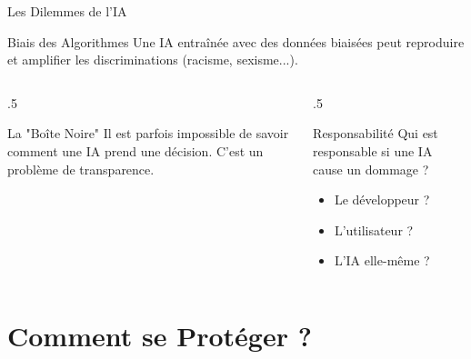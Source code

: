\documentclass[10pt, aspectratio=169]{beamer}
\begin{document}
\begin{frame}{Les Dilemmes de l'IA}
  \begin{alertblock}{Biais des Algorithmes}
    Une IA entraînée avec des données biaisées peut reproduire et amplifier les discriminations (racisme, sexisme...). 
  \end{alertblock}

  \begin{columns}[T]
    \begin{column}{.5\textwidth}
      \begin{block}{La "Boîte Noire"}
        Il est parfois impossible de savoir comment une IA prend une décision. C'est un problème de transparence.
      \end{block}
    \end{column}
    \begin{column}{.5\textwidth}
      \begin{block}{Responsabilité}
        Qui est responsable si une IA cause un dommage ?
        \begin{itemize}
          \item Le développeur ?
          \item L'utilisateur ?
          \item L'IA elle-même ?
        \end{itemize}
      \end{block}
    \end{column}
  \end{columns}
\end{frame}

\section{Comment se Protéger ?}
\end{document}

